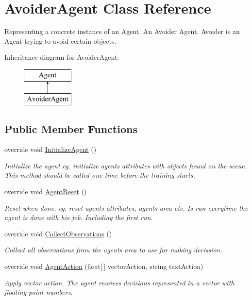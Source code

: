 \hypertarget{class_avoider_agent}{}\section{Avoider\+Agent Class Reference}
\label{class_avoider_agent}


Representing a concrete instance of an Agent. An Avoider Agent. Avoider is an Agent trying to avoid certain objects.  


Inheritance diagram for Avoider\+Agent\+:\begin{figure}[H]
\begin{center}
\leavevmode
\includegraphics[height=2.000000cm]{class_avoider_agent}
\end{center}
\end{figure}
\subsection*{Public Member Functions}
\begin{DoxyCompactItemize}
\item 
override void \mbox{\hyperlink{class_avoider_agent_a4a4fce491018ac1d6ae86e7f73e86e14}{Initialize\+Agent}} ()
\begin{DoxyCompactList}\small\item\em Initialize the agent eg. initialize agents attributes with objects found on the scene. This method should be called one time before the training starts. \end{DoxyCompactList}\item 
override void \mbox{\hyperlink{class_avoider_agent_a6c3b0dd60ad0cf044226598380f68cec}{Agent\+Reset}} ()
\begin{DoxyCompactList}\small\item\em Reset when done. eg. reset agents attributes, agents area etc. Is run everytime the agent is done with his job. Including the first run. \end{DoxyCompactList}\item 
override void \mbox{\hyperlink{class_avoider_agent_ad0c2e2af7583acca8de21638dd33851b}{Collect\+Observations}} ()
\begin{DoxyCompactList}\small\item\em Collect all observations from the agents area to use for making decission. \end{DoxyCompactList}\item 
override void \mbox{\hyperlink{class_avoider_agent_abfd20494a54e28c93e41f611959fdf05}{Agent\+Action}} (float\mbox{[}$\,$\mbox{]} vector\+Action, string text\+Action)
\begin{DoxyCompactList}\small\item\em Apply vector action. The agent receives decisions represented in a vector with floating point numbers. \end{DoxyCompactList}\end{DoxyCompactItemize}
